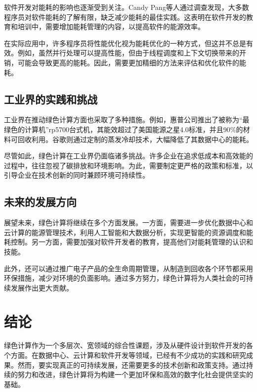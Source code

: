 软件开发对能耗的影响也逐渐受到关注。Candy Pang等人通过调查发现，大多数程序员对软件能耗的了解有限，缺乏减少能耗的最佳实践​​。这表明在软件开发的教育和培训中，需要增加能耗管理的内容，以提高软件的能源效率。\cite{pang2016what}

在实际应用中，许多程序员将性能优化视为能耗优化的一种方式，但这并不总是有效。例如，虽然并行处理可以提高性能，但由于线程调度和上下文切换带来的开销，可能会导致更高的能耗​​。因此，需要更加精细的方法来评估和优化软件的能耗。

\section{工业界的实践和挑战}

工业界在推动绿色计算方面也采取了多种措施。例如，惠普公司推出了被称为“最绿色的计算机”rp5700台式机，其能效超过了美国能源之星4.0标准，并且90\%的材料可回收利用​​。谷歌则通过定制的蒸发冷却技术，大幅降低了其数据中心的能耗​​。\cite{kurp2008green}

尽管如此，绿色计算在工业界仍面临诸多挑战。许多企业在追求低成本和高效能的过程中，往往忽视了碳排放和环境影响。为此，需要制定更严格的政策和标准，以引导企业在技术创新的同时兼顾环境可持续性。

\section{未来的发展方向}

展望未来，绿色计算将继续在多个方面发展。一方面，需要进一步优化数据中心和云计算的能源管理技术，利用人工智能和大数据分析，实现更智能的资源调度和能耗控制​​。另一方面，需要加强对软件开发者的教育，提高他们对能耗管理的认识和技能​​。\cite{pang2016what}

此外，还可以通过推广电子产品的全生命周期管理，从制造到回收各个环节都采用环保措施，减少对环境的负面影响。\cite{kurp2008green}通过多方努力，绿色计算将为人类社会的可持续发展作出更大贡献。

\chapter{结论}

绿色计算作为一个多层次、宽领域的综合性课题，涉及从硬件设计到软件开发的各个方面。在数据中心、云计算和软件开发等领域，已经有不少成功的实践和研究成果。然而，要实现真正的可持续发展，还需要更多的技术创新和政策支持。通过持续的努力和改进，绿色计算将为构建一个更加环保和高效的数字化社会提供坚实的基础。
